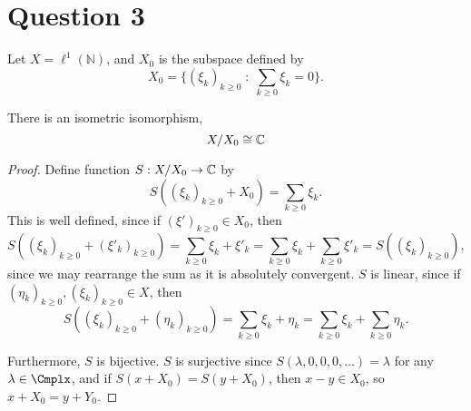 \documentclass{unswmaths}
\begin{document}
\section*{Question 3}
Let $X = \ell^1(\mathbb{N})$, and $X_0$ is the subspace defined by
\begin{equation*}
    X_0 = \{ (\xi_k)_{k\geq 0} \;:\;\sum_{k\geq 0} \xi_k = 0\}.
\end{equation*}
\begin{theorem}
    There is an isometric isomorphism,
    \begin{equation*}
        X/X_0 \cong \mathbb{C}
    \end{equation*}
\end{theorem}
\begin{proof}
    Define function $S:X/X_0\rightarrow \mathbb{C}$ by
    \begin{equation*}
        S((\xi_k)_{k\geq 0}+X_0) = \sum_{k\geq 0} \xi_k.
    \end{equation*}
    This is well defined, since if $(\xi')_{k\geq 0} \in X_0$, then 
    \begin{equation*}
        S((\xi_k)_{k\geq 0}+(\xi'_k)_{k\geq 0}) = \sum_{k\geq 0} \xi_k+\xi'_k = \sum_{k\geq 0}\xi_k + \sum_{k\geq 0}\xi'_k = S((\xi_k)_{k\geq 0}),
    \end{equation*}
    since we may rearrange the sum as it is absolutely convergent. $S$ is linear, since if $(\eta_k)_{k\geq0},(\xi_k)_{k\geq0} \in X$, then
    \begin{equation*}
        S((\xi_k)_{k\geq 0}+(\eta_k)_{k\geq 0}) = \sum_{k\geq 0} \xi_k+\eta_k = \sum_{k\geq 0}\xi_k + \sum_{k\geq 0} \eta_k.
    \end{equation*}
    
    Furthermore, $S$ is bijective. $S$ is surjective since $S(\lambda,0,0,0,\ldots) = \lambda$ for any $\lambda \in \Cmplx$,
    and if $S(x+X_0) = S(y+X_0)$, then $x-y \in X_0$, so $x+X_0 = y+Y_0$. 
    
    
    
     
    
\end{proof}
\end{document}
